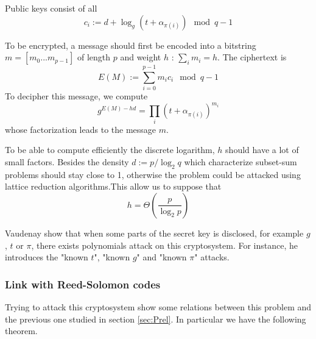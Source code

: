 \documentclass[a4paper]{article}
\begin{document}
Public keys consist of all
$$ c_i := d + \log_g(t + \alpha_{\pi(i)}) \mod q-1 $$

To be encrypted, a message should first be encoded into a bitstring $m = [m_0...m_{p-1}]$ of length $p$ and weight $h$ : $\sum_i m_i = h$. The ciphertext is
$$ E(M) := \sum_{i=0}^{p-1} m_i c_i \mod q-1 $$
To decipher this message, we compute
$$ g^{E(M) - hd} =  \prod_i \left( t + \alpha_{\pi(i)}\right)^{m_i} $$
whose factorization leads to the message $m$.

To be able to compute efficiently the discrete logarithm, $h$ should have a lot of small factors. Besides the density $d := p / \log_2 q$ which characterize subset-sum problems should stay close to 1, otherwise the problem could be attacked using lattice reduction algorithms.This allow us to suppose that
$$ h = \Theta\left( \frac{p}{\log_2 p} \right) $$

Vaudenay show that when some parts of the secret key is disclosed, for example $g$, $t$ or $\pi$, there exists polynomials attack on this cryptosystem. For instance, he introduces the "known $t$", "known $g$" and "known $\pi$" attacks.

\subsubsection{Link with Reed-Solomon codes}

Trying to attack this cryptosystem show some relations between this problem and the previous one studied in section \ref{sec:Prel}. In particular we have the following theorem.
\end{document}

